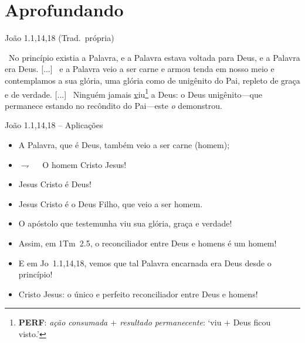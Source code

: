 \documentclass[12pt,aspectratio=169]{beamer}
\newcommand{\ver}[1]{%
    \raisebox{0.50ex}{%
        \scalebox{1.1}{%
            \pmb{\textbf{\textcolor{BSpbg}{#1}}}%
        }%
    }%
}
\newcommand{\QUOTE}[1]{%
    \par\noindent\hspace*{0.1\linewidth}%
    \begin{minipage}{0.8\linewidth}%
        \linespread{1.35}\large{#1}%
    \end{minipage}%
}
\newcommand{\RED}[1]{{\textcolor{TXred}{#1}}}
\newcommand{\YEL}[1]{{\textcolor{TXyel}{#1}}}
\newcommand{\BLU}[1]{{\textcolor{TXblu}{#1}}}
\newcommand{\MAG}[1]{{\textcolor{TXmag}{#1}}}
\newcommand{\BRI}[1]{{\textcolor{BSpbg}{#1}}}   %
\begin{document}
\section{Aprofundando}

    \begin{frame}{João 1.1,14,18 (Trad.~própria)}
        \QUOTE{%
            \normalsize
            \ver{1}~No princípio existia \MAG{a Palavra}, e \MAG{a Palavra}  estava  voltada
            para \BRI{Deus}, e \MAG{a Palavra era Deus}.  [...]  \ver{14}~e  \MAG{a  Palavra
            veio a ser carne} e armou tenda em nosso meio e contemplamos a sua \YEL{glória},
            uma \YEL{glória} como de unigênito do \BRI{Pai}, repleto  de  \YEL{graça}  e  de
            \YEL{verdade}.             [...]             \ver{18}~Ninguém             jamais
            \underline{v}iu\footnote{\textbf{\textsf{PERF}}:  \textit{ação  consumada  $+$  resultado
            permanecente\/}:  `viu  $+$  Deus  ficou  visto.'}  a  \BRI{Deus}:  o  \MAG{Deus
            unigênito}---que  permanece  estando  no  recôndito  do  \BRI{Pai}---este   {\it
            \BRI{o}} demonstrou.
        }
    \end{frame}

    \begin{frame}{João 1.1,14,18 -- Aplicações}
        \begin{itemize}
            \item<1-> A \MAG{Palavra}, que é \BLU{Deus}, também veio a ser \RED{carne} (homem);
            \item<2-> $\rightharpoondown\quad$ O homem \MAG{Cristo Jesus}!
            \item<3-> Jesus Cristo \YEL{é Deus}!$\qquad$\uncover<4->{\BRI{Ele é o meu Deus!}}
            \item<5-> Jesus Cristo \YEL{é} o \BLU{Deus Filho}, que veio a ser \RED{homem}.
            \item<6-> O apóstolo que testemunha viu sua \YEL{glória}, \YEL{graça} e
                \YEL{verdade}! \\[\bigskipamount]
            \item<7-> Assim, em 1Tm~2.5, o reconciliador entre \BLU{Deus} e \RED{homens} é um
                \MAG{homem}!
            \item<8-> E em Jo~1.1,14,18, vemos que tal \MAG{Palavra} \RED{encarnada} era
                \BLU{Deus} desde o princípio! \\[\bigskipamount]
            \item<9-> \MAG{Cristo Jesus}: o \YEL{único} e perfeito \MAG{reconciliador} entre
                \BLU{Deus} e \RED{homens}!
        \end{itemize}
    \end{frame}

\end{document}
